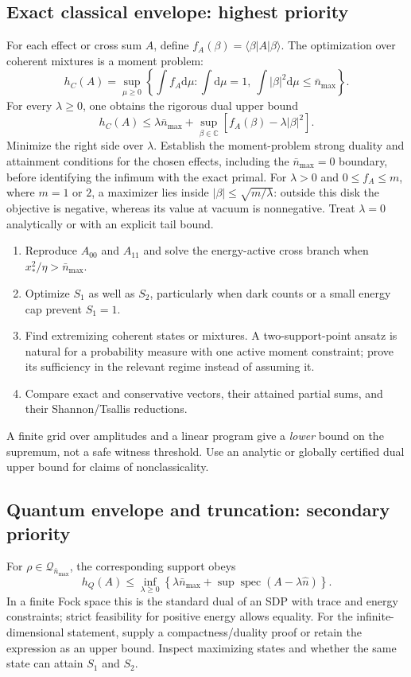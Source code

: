 \documentclass[11pt,a4paper]{article}
\newcommand{\spec}{\operatorname{spec}}
\newcommand{\Qset}{\mathcal Q}
\newcommand{\nbar}{\bar n_{\max}}
\newcommand{\ket}[1]{\lvert #1\rangle}
\newcommand{\bra}[1]{\langle #1\rvert}
\newcommand{\abs}[1]{\lvert #1\rvert}
\newcommand{\dd}{\mathrm d}
\begin{document}
\subsection{Exact classical envelope: highest priority}
For each effect or cross sum $A$, define $f_A(\beta)=\bra\beta A\ket\beta$.
The optimization over coherent mixtures is a moment problem:
\begin{equation}
 h_C(A)=\sup_{\mu\geq0}\left\{\int f_A\dd\mu:
 \int\dd\mu=1,\ \int\abs\beta^2\dd\mu\leq\nbar\right\}.
 \label{eq:classicalprimal}
\end{equation}
For every $\lambda\geq0$, one obtains the rigorous dual upper bound
\begin{equation}
 h_C(A)\leq\lambda\nbar+
 \sup_{\beta\in\mathbb C}[f_A(\beta)-\lambda\abs\beta^2].
 \label{eq:classicaldual}
\end{equation}
Minimize the right side over $\lambda$. Establish the moment-problem strong
duality and attainment conditions for the chosen effects, including the
$\nbar=0$ boundary, before identifying the infimum with the exact primal.
For $\lambda>0$ and $0\leq f_A\leq m$, where $m=1$ or $2$, a maximizer lies
inside $\abs\beta\leq\sqrt{m/\lambda}$: outside this disk the objective is
negative, whereas its value at vacuum is nonnegative. Treat $\lambda=0$
analytically or with an explicit tail bound.

\begin{enumerate}
\item Reproduce $A_{00}$ and $A_{11}$ and solve the energy-active cross branch
when $x_*^2/\eta>\nbar$.
\item Optimize $S_1$ as well as $S_2$, particularly when dark counts or a small
energy cap prevent $S_1=1$.
\item Find extremizing coherent states or mixtures. A two-support-point ansatz
is natural for a probability measure with one active moment constraint;
prove its sufficiency in the relevant regime instead of assuming it.
\item Compare exact and conservative vectors, their attained partial sums,
and their Shannon/Tsallis reductions.
\end{enumerate}
A finite grid over amplitudes and a linear program give a \emph{lower} bound
on the supremum, not a safe witness threshold. Use an analytic or globally
certified dual upper bound for claims of nonclassicality.

\subsection{Quantum envelope and truncation: secondary priority}
For $\rho\in\Qset_{\nbar}$, the corresponding support obeys
\begin{equation}
 h_Q(A)\leq\inf_{\lambda\geq0}
 \left\{\lambda\nbar+\sup\spec(A-\lambda\hat n)\right\}.
 \label{eq:quantumdual}
\end{equation}
In a finite Fock space this is the standard dual of an SDP with trace and
energy constraints; strict feasibility for positive energy allows equality.
For the infinite-dimensional statement, supply a compactness/duality proof
or retain the expression as an upper bound. Inspect maximizing states and
whether the same state can attain $S_1$ and $S_2$.
\end{document}
